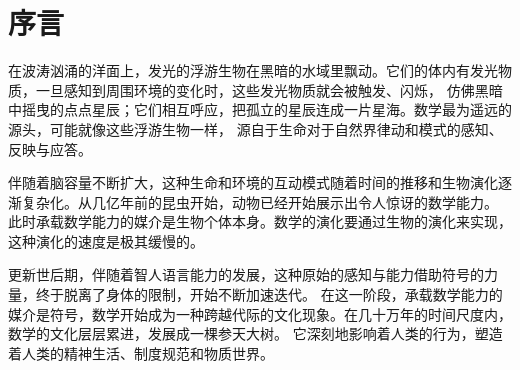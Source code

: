 \chapter*{序言}

在波涛汹涌的洋面上，发光的浮游生物在黑暗的水域里飘动。它们的体内有发光物质，一旦感知到周围环境的变化时，这些发光物质就会被触发、闪烁，
仿佛黑暗中摇曳的点点星辰；它们相互呼应，把孤立的星辰连成一片星海。数学最为遥远的源头，可能就像这些浮游生物一样，
源自于生命对于自然界律动和模式的感知、反映与应答。

伴随着脑容量不断扩大，这种生命和环境的互动模式随着时间的推移和生物演化逐渐复杂化。从几亿年前的昆虫开始，动物已经开始展示出令人惊讶的数学能力。
此时承载数学能力的媒介是生物个体本身。数学的演化要通过生物的演化来实现，这种演化的速度是极其缓慢的。

更新世后期，伴随着智人语言能力的发展，这种原始的感知与能力借助符号的力量，终于脱离了身体的限制，开始不断加速迭代。
在这一阶段，承载数学能力的媒介是符号，数学开始成为一种跨越代际的文化现象。在几十万年的时间尺度内，数学的文化层层累进，发展成一棵参天大树。
它深刻地影响着人类的行为，塑造着人类的精神生活、制度规范和物质世界。

